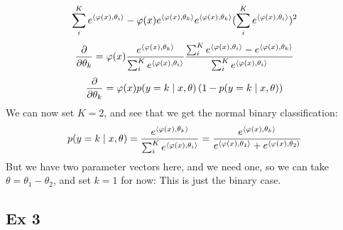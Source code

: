 \documentclass[12pt]{article}
\begin{document}
\begin{enumerate}[label = \letters]
\[{    \sum_i^K e^{\left\langle \varphi(x), \theta_i \right\rangle}
    - \varphi(x)e^{\left\langle \varphi(x), \theta_k \right\rangle}
    e^{\left\langle \varphi(x), \theta_k \right\rangle}}
    {(\sum_i^K e^{\left\langle \varphi(x), \theta_i \right\rangle})^2} \]
    \[ \dfrac{\partial }{\partial \theta_k}
    = \varphi(x) \dfrac{
    e^{\left\langle \varphi(x), \theta_k \right\rangle}}
    {\sum_i^K e^{\left\langle \varphi(x), \theta_i \right\rangle}}
    \dfrac{\sum_i^K e^{\left\langle \varphi(x), \theta_i \right\rangle}
    - e^{\left\langle \varphi(x), \theta_k \right\rangle}}
    {\sum_i^K e^{\left\langle \varphi(x), \theta_i \right\rangle}} \]
    \[ \dfrac{\partial }{\partial \theta_k}
    = \varphi(x) p(y = k \mid x, \theta)
    \left( 1 - p(y = k \mid x, \theta) \right) \]
    We can now set $K = 2$,
    and see that we get the normal binary
    classification:
    \[  p(y = k \mid x, \theta) = 
    \dfrac{e^{\left\langle \varphi(x), \theta_k \right\rangle}}
    {\sum_i^K e^{\left\langle \varphi(x), \theta_i \right\rangle}}
    = \dfrac{e^{\left\langle \varphi(x), \theta_k \right\rangle}}
    {e^{\left\langle \varphi(x), \theta_1 \right\rangle}
    + e^{\left\langle \varphi(x), \theta_2 \right\rangle}}\]
    But we have two parameter vectors here,
    and we need one, so we can take
    $\theta = \theta_1 - \theta_2$,
    and set $k = 1$ for now:
    This is just the binary case. \\
\end{enumerate}

\newpage

\subsection*{Ex 3}
\end{document}
